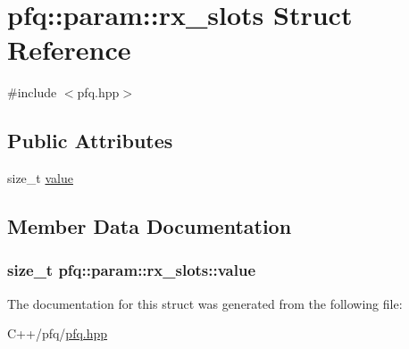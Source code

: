 \hypertarget{structpfq_1_1param_1_1rx__slots}{\section{pfq\+:\+:param\+:\+:rx\+\_\+slots Struct Reference}
\label{structpfq_1_1param_1_1rx__slots}
}


{\ttfamily \#include $<$pfq.\+hpp$>$}

\subsection*{Public Attributes}
\begin{DoxyCompactItemize}
\item 
size\+\_\+t \hyperlink{structpfq_1_1param_1_1rx__slots_a2bafbed5d322cf89df33ca10bc397822}{value}
\end{DoxyCompactItemize}


\subsection{Member Data Documentation}
\hypertarget{structpfq_1_1param_1_1rx__slots_a2bafbed5d322cf89df33ca10bc397822}{
\subsubsection[{value}]{\setlength{\rightskip}{0pt plus 5cm}size\+\_\+t pfq\+::param\+::rx\+\_\+slots\+::value}}\label{structpfq_1_1param_1_1rx__slots_a2bafbed5d322cf89df33ca10bc397822}


The documentation for this struct was generated from the following file\+:\begin{DoxyCompactItemize}
\item 
C++/pfq/\hyperlink{pfq_8hpp}{pfq.\+hpp}\end{DoxyCompactItemize}
